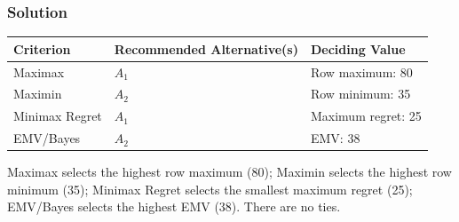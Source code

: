 \subsubsection*{Solution}
\label{subsec:c8-festival-solution}
\begin{center}
\begin{tabular}{lll}\toprule
Criterion & Recommended Alternative(s) & Deciding Value\\\midrule
Maximax & $A_1$ & Row maximum: 80\\
Maximin & $A_2$ & Row minimum: 35\\
Minimax Regret & $A_1$ & Maximum regret: 25\\
EMV/Bayes & $A_2$ & EMV: 38\\\bottomrule
\end{tabular}
\end{center}
Maximax selects the highest row maximum (80); Maximin selects the highest row minimum (35); Minimax Regret selects the smallest maximum regret (25); EMV/Bayes selects the highest EMV (38). There are no ties.


